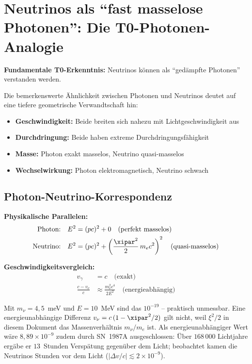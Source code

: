 	\section{Neutrinos als ``fast masselose Photonen'': Die T0-Photonen-Analogie}
	
	\begin{speculation}
		\textbf{Fundamentale T0-Erkenntnis:} Neutrinos können als ``gedämpfte Photonen'' verstanden werden.
		
		Die bemerkenswerte Ähnlichkeit zwischen Photonen und Neutrinos deutet auf eine tiefere geometrische Verwandtschaft hin:
		\begin{itemize}
			\item \textbf{Geschwindigkeit:} Beide breiten sich nahezu mit Lichtgeschwindigkeit aus
			\item \textbf{Durchdringung:} Beide haben extreme Durchdringungsfähigkeit
			\item \textbf{Masse:} Photon exakt masselos, Neutrino quasi-masselos
			\item \textbf{Wechselwirkung:} Photon elektromagnetisch, Neutrino schwach
		\end{itemize}
	\end{speculation}
	
	\subsection{Photon-Neutrino-Korrespondenz}
	
	\begin{photon}
		\textbf{Physikalische Parallelen:}
		\begin{align}
			\text{Photon:} \quad &E^2 = (pc)^2 + 0 \quad \text{(perfekt masselos)} \\
			\text{Neutrino:} \quad &E^2 = (pc)^2 + \left(\frac{\xipar^2}{2}\, m_e c^2\right)^2 \quad \text{(quasi-masselos)}
		\end{align}
		
		\textbf{Geschwindigkeitsvergleich:}
		\begin{align}
			v_\gamma &= c \quad \text{(exakt)} \\
						\frac{c - v_\nu}{c} &\approx \frac{m_\nu^2 c^4}{2E^2} \quad \text{(energieabhängig)}
		\end{align}

		Mit $m_\nu = 4,5$~meV und $E = 10$~MeV sind das $10^{-19}$ -- praktisch unmessbar. Eine energieunabhängige Differenz $v_\nu = c\,(1 - \xipar^2/2)$ gilt nicht, weil $\xi^2/2$ in diesem Dokument das Massenverhältnis $m_\nu/m_e$ ist. Als energieunabhängiger Wert wäre $8,89\times10^{-9}$ zudem durch SN~1987A ausgeschlossen: Über $168\,000$ Lichtjahre ergäbe er $13$~Stunden Verspätung gegenüber dem Licht; beobachtet kamen die Neutrinos Stunden vor dem Licht ($|\Delta v/c| \lesssim 2\times10^{-9}$).
	\end{photon}
	
